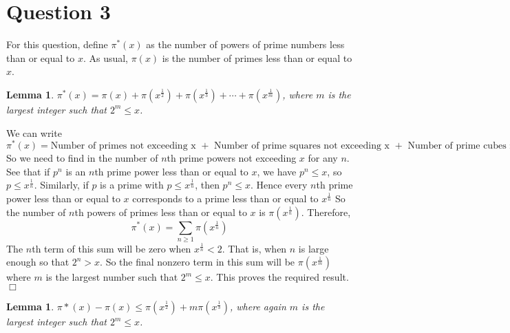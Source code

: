 \documentclass[10pt]{article}
\newtheorem{lemma}[theorem]{Lemma}
\newenvironment{proof}[1][Proof]{\begin{trivlist}
\item[\hskip \labelsep {\bfseries #1}]}{\end{trivlist}}
\begin{document}
\section*{Question 3}
For this question, define $\pi^*(x)$
as the number of powers of prime numbers less than or equal to $x$.
As usual, $\pi(x)$ is the number of primes less than or equal to $x$.
\begin{lemma}
\label{piStarFormula}
    $\pi^*(x) = \pi(x)+\pi(x^\frac{1}{2})+\pi(x^{\frac{1}{3}})+\cdots+\pi(x^\frac{1}{m})$,
    where $m$ is the largest integer such that $2^m\leq x$.
\end{lemma}
\begin{proof}
    We can write
    \begin{equation*}
        \pi^*(x) = \text{Number of primes not exceeding x }+\text{ Number of prime squares not exceeding x }+\text{ Number of prime
        cubes not exceeding x} +\cdots
    \end{equation*}
    So we need to find in the number of $n$th prime powers not exceeding $x$ for
    any $n$. See that if $p^n$ is an $n$th prime power less than or equal to $x$,
    we have $p^n \leq x$, so $p \leq x^\frac{1}{n}$. Similarly, if $p$
    is a prime with $p \leq x^\frac{1}{n}$, then $p^n\leq x$. Hence
    every $n$th prime power less than or equal to $x$ corresponds
    to a prime less than or equal to $x^{\frac{1}{n}}$
    So the number of $n$th powers of primes less than or equal to $x$
    is $\pi(x^\frac{1}{n})$.
    Therefore,
    \begin{equation*}
        \pi^*(x) = \sum_{n\geq 1} \pi(x^\frac{1}{n})
    \end{equation*}
    The $n$th term of this sum will be zero when $x^\frac{1}{n} < 2$. That is,
    when $n$ is large enough so that $2^n > x$. So 
    the final nonzero term in this sum will be $\pi(x^{\frac{1}{m}})$ where
    $m$ is the largest number such that $2^m \leq x$.
    This proves the required result. $\Box$
\end{proof}
\begin{lemma}
    $\pi*(x)-\pi(x) \leq \pi(x^\frac{1}{2})+m\pi(x^\frac{1}{3})$, where
    again $m$ is the largest integer
    such that $2^m\leq x$.
\end{lemma} 
\end{document}
